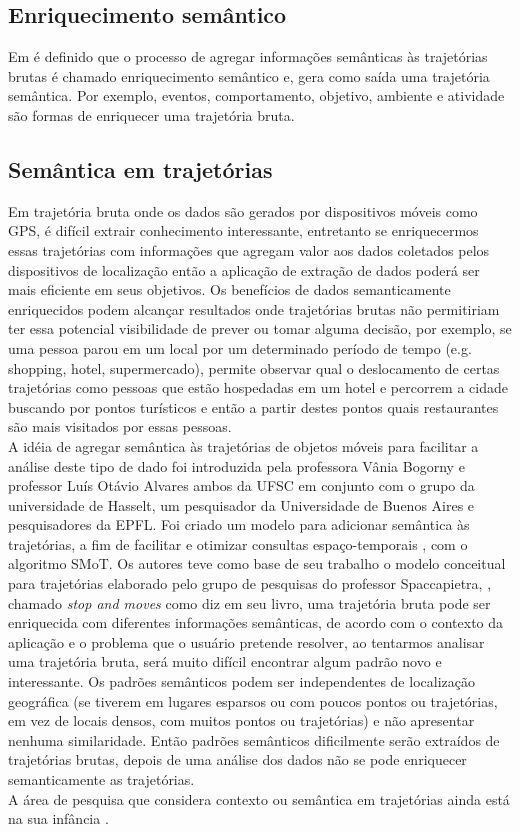 \documentclass[	12pt, Times, openright, twoside, a4paper, english, brazil]{abntex2}
\begin{document}
\subsection{Enriquecimento semântico}
Em \cite{Furletti2013} é definido que o processo de agregar informações semânticas às trajetórias brutas é chamado enriquecimento semântico e, gera como saída uma trajetória semântica. Por exemplo, eventos, comportamento, objetivo, ambiente e atividade são formas de enriquecer uma trajetória bruta.

\subsection{Semântica em trajetórias}
Em trajetória bruta onde os dados são gerados por dispositivos móveis como GPS, é difícil extrair conhecimento interessante, entretanto se enriquecermos essas trajetórias com informações que agregam valor aos dados coletados pelos dispositivos de localização então a aplicação de extração de dados poderá ser mais eficiente em seus objetivos. Os benefícios de dados semanticamente enriquecidos podem alcançar resultados onde trajetórias brutas não permitiriam ter essa potencial visibilidade de prever ou tomar alguma decisão, por exemplo, se uma pessoa parou em um local por um determinado período de tempo (e.g. shopping, hotel, supermercado), permite observar qual o deslocamento de certas trajetórias como pessoas que estão hospedadas em um hotel e percorrem a cidade buscando por pontos turísticos e então a partir destes pontos quais restaurantes são mais visitados por essas pessoas.\\
\indent A idéia de agregar semântica às trajetórias de objetos móveis para facilitar a análise deste tipo de dado foi introduzida pela professora Vânia Bogorny e professor Luís Otávio Alvares ambos da UFSC em conjunto com o grupo da universidade de Hasselt, um pesquisador da Universidade de Buenos Aires e pesquisadores da EPFL. Foi criado um modelo para adicionar semântica às trajetórias, a fim de facilitar e otimizar consultas espaço-temporais \cite{alvares2007}, com o algoritmo SMoT. Os autores teve como base de seu trabalho o modelo conceitual para trajetórias elaborado pelo grupo de pesquisas do professor Spaccapietra, \cite{Spaccapietra2008}, chamado \textit{stop and moves} como \cite{Bogorny2012} diz em seu livro, uma trajetória bruta pode ser enriquecida com diferentes informações semânticas, de acordo com o contexto da aplicação e o problema que o usuário pretende resolver, ao tentarmos analisar uma trajetória bruta, será muito difícil encontrar algum padrão novo e interessante. Os padrões semânticos podem ser independentes de localização geográfica (se tiverem em lugares esparsos ou com poucos pontos ou trajetórias, em vez de locais densos, com muitos pontos ou trajetórias) e não apresentar nenhuma similaridade. Então padrões semânticos dificilmente serão extraídos de trajetórias brutas, depois de uma análise dos dados não se pode enriquecer semanticamente as trajetórias.\\
\indent	A área de pesquisa que considera contexto ou semântica em trajetórias ainda está na sua infância \cite{Bogorny2012}. 
\end{document}
